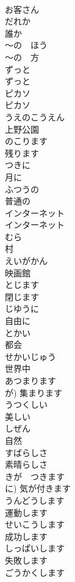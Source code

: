 \documentclass[8pt]{extreport}
\begin{document}
\begin{CJK}{UTF8}{min}
\\	お客さん		
\\	だれか	
\\	誰か	
\\	〜の　ほう	
\\	〜の　方		
\\	ずっと	
\\	ずっと	
\\	ピカソ	
\\	ピカソ		
\\	うえのこうえん	
\\	上野公園		
\\	のこります	
\\	残ります		
\\	つきに	
\\	月に		
\\	ふつうの	
\\	普通の		
\\	インターネット	
\\	インターネット		
\\	むら	
\\	村		
\\	えいがかん	
\\	映画館		
\\	とじます	
\\	閉じます		
\\	じゆうに	
\\	自由に		
\\	とかい	
\\	都会		
\\	せかいじゅう	
\\	世界中		
\\	あつまります	
\\	が)	集まります		
\\	うつくしい	
\\	美しい		
\\	しぜん	
\\	自然		
\\	すばらしさ	
\\	素晴らしさ		
\\	きが　つきます	
\\	に)	気が付きます		
\\	うんどうします	
\\	運動します	
\\	せいこうします	
\\	成功します		
\\	しっぱいします	
\\	失敗します		
\\	ごうかくします	

\end{CJK}
\end{document}
